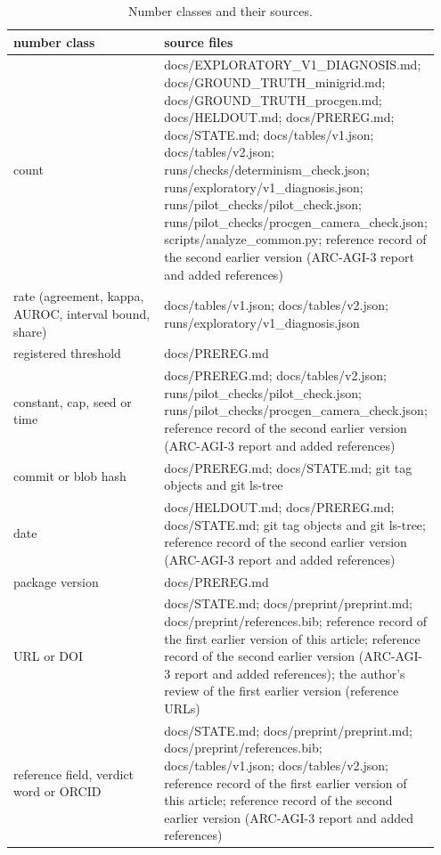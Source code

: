 \documentclass[journal,onecolumn]{IEEEtran}
\begin{document}
\begin{table}[!htbp]
\renewcommand{\thetable}{S5}
\caption{Number classes and their sources.}
\centering
\footnotesize
\renewcommand{\arraystretch}{1.15}
\setlength{\tabcolsep}{4pt}
\begin{tabular}{>{\raggedright\arraybackslash}p{0.473\linewidth}>{\raggedright\arraybackslash}p{0.473\linewidth}}
\hline
\textbf{number class} & \textbf{source files} \\ \hline
count & docs/EXPLORATORY\_V1\_DIAGNOSIS.md; docs/GROUND\_TRUTH\_minigrid.md;
docs/GROUND\_TRUTH\_procgen.md; docs/HELDOUT.md; docs/PREREG.md;
docs/STATE.md; docs/tables/v1.json; docs/tables/v2.json;
runs/checks/determinism\_check.json;
runs/exploratory/v1\_diagnosis.json;
runs/pilot\_checks/pilot\_check.json;
runs/pilot\_checks/procgen\_camera\_check.json;
scripts/analyze\_common.py; reference record of the second earlier
version (ARC-AGI-3 report and added references) \\
rate (agreement, kappa, AUROC, interval bound, share) & docs/tables/v1.json; docs/tables/v2.json;
runs/exploratory/v1\_diagnosis.json \\
registered threshold & docs/PREREG.md \\
constant, cap, seed or time & docs/PREREG.md; docs/tables/v2.json;
runs/pilot\_checks/pilot\_check.json;
runs/pilot\_checks/procgen\_camera\_check.json; reference record of the
second earlier version (ARC-AGI-3 report and added references) \\
commit or blob hash & docs/PREREG.md; docs/STATE.md; git tag objects and git ls-tree \\
date & docs/HELDOUT.md; docs/PREREG.md; docs/STATE.md; git tag objects and git
ls-tree; reference record of the second earlier version (ARC-AGI-3
report and added references) \\
package version & docs/PREREG.md \\
URL or DOI & docs/STATE.md; docs/preprint/preprint.md; docs/preprint/references.bib;
reference record of the first earlier version of this article; reference
record of the second earlier version (ARC-AGI-3 report and added
references); the author's review of the first earlier version (reference
URLs) \\
reference field, verdict word or ORCID & docs/STATE.md; docs/preprint/preprint.md; docs/preprint/references.bib;
docs/tables/v1.json; docs/tables/v2.json; reference record of the first
earlier version of this article; reference record of the second earlier
version (ARC-AGI-3 report and added references) \\
\hline
\end{tabular}
\end{table}
\end{document}
